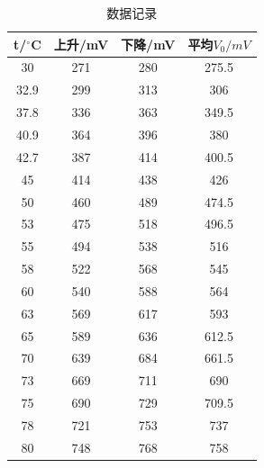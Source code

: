 \documentclass[10pt,a4paper,twocolumn,twoside,UTF8]{ctexart}
\begin{document}
	\begin{table}[htbp]
	  \centering
	    \begin{tabular}{cccc}
	    \toprule
	    t/$^{\circ}$C & 上升/mV & 下降/mV & 平均$V_0/mV$ \\
	    \midrule
	    30    & 271   & 280   & 275.5 \\
	    32.9  & 299   & 313   & 306 \\
	    37.8  & 336   & 363   & 349.5 \\
	    40.9  & 364   & 396   & 380 \\
	    42.7  & 387   & 414   & 400.5 \\
	    45    & 414   & 438   & 426 \\
	    50    & 460   & 489   & 474.5 \\
	    53    & 475   & 518   & 496.5 \\
	    55    & 494   & 538   & 516 \\
	    58    & 522   & 568   & 545 \\
	    60    & 540   & 588   & 564 \\
	    63    & 569   & 617   & 593 \\
	    65    & 589   & 636   & 612.5 \\
	    70    & 639   & 684   & 661.5 \\
	    73    & 669   & 711   & 690 \\
	    75    & 690   & 729   & 709.5 \\
	    78    & 721   & 753   & 737 \\
	    80    & 748   & 768   & 758 \\
	    \bottomrule
	    \end{tabular}%
	  \caption{数据记录}
	  \label{tab:addlabel}%
	\end{table}%

\end{document}
